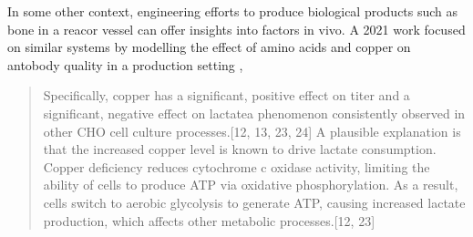 {


In some other context, engineering efforts to produce
biological products such as bone in a reacor vessel
can offer insights into factors in vivo.
A 2021 work focused on similar systems by modelling the
effect of amino acids and copper on antobody quality in 
a production setting 
\cite{PMID32875683},
\begin{quote}
{Specifically, copper has a significant, positive effect on titer and a
significant, negative effect on lactatea phenomenon consistently observed
in other CHO cell culture processes.{[}12, 13, 23, 24{]} A plausible explanation
is that the increased copper level is known to drive lactate consumption.
Copper deficiency reduces cytochrome c oxidase activity, limiting the ability
of cells to produce ATP via oxidative phosphorylation. As a result, cells
switch to aerobic glycolysis to generate ATP, causing increased lactate
production, which affects other metabolic processes.{[}12, 23{]}}
\end{quote}



} %
